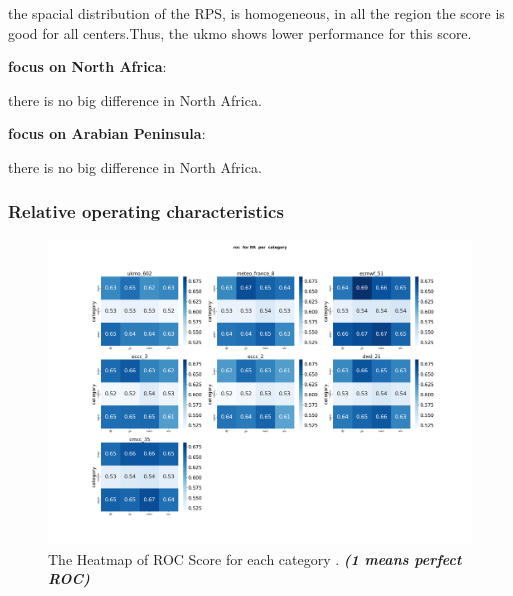 the spacial distribution of the RPS, is homogeneous, in all the region the score is good for all centers.Thus, the ukmo shows lower performance for this score.

\vspace{1.5cm}
\textbf{focus on North Africa}:

there is no big difference in North Africa.

\vspace{1.5cm}
\textbf{focus on Arabian Peninsula}:

there is no big difference in North Africa.


\subsubsection{Relative operating characteristics}

\begin{figure}[H]
    \centering
    \includegraphics[scale=0.25]{plots/prob/roc/roc_RR_category.png}
    \caption{The Heatmap of ROC Score for each category  . \textbf{\textit{(1 means perfect ROC)}}}
\end{figure}

